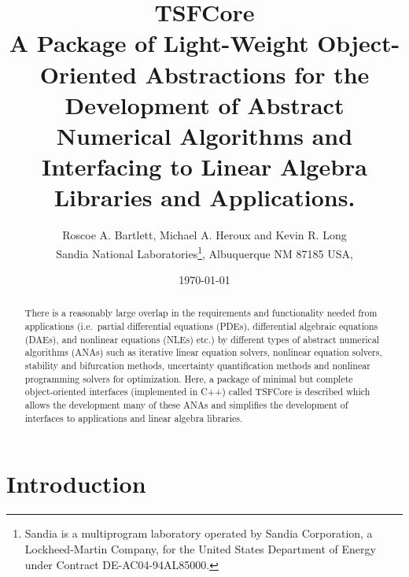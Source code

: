 \documentclass[10pt,fleqn]{article}
\begin{document}
%
%
\title{
{\Huge\bf TSFCore}\\[1.5ex]
A Package of Light-Weight Object-Oriented Abstractions for the
Development of Abstract Numerical Algorithms and Interfacing
to Linear Algebra Libraries and Applications.
}
\author{Roscoe A. Bartlett, Michael A. Heroux and Kevin R. Long \\
Sandia National Laboratories\footnote{
Sandia is a multiprogram laboratory operated by Sandia Corporation, a
Lockheed-Martin Company, for the United States Department of Energy
under Contract DE-AC04-94AL85000.}, Albuquerque NM 87185 USA, \\
}
\date{\today}

\maketitle

%
\begin{abstract}
%

There is a reasonably large overlap in the requirements and
functionality needed from applications (i.e.~partial differential
equations (PDEs), differential algebraic equations (DAEs), and
nonlinear equations (NLEs) etc.) by different types of abstract
numerical algorithms (ANAs) such as iterative linear equation solvers,
nonlinear equation solvers, stability and bifurcation methods,
uncertainty quantification methods and nonlinear programming solvers
for optimization.  Here, a package of minimal but complete
object-oriented interfaces (implemented in C++) called TSFCore is
described which allows the development many of these ANAs and
simplifies the development of interfaces to applications and linear
algebra libraries.

%
\end{abstract}
%

\tableofcontents

\listoffigures

\section{Introduction}
\end{document}
